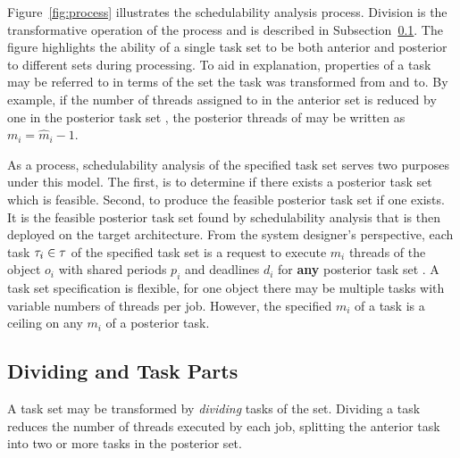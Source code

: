 Figure~\ref{fig:process} illustrates the schedulability analysis
process. Division is the transformative operation of the process and
is described in Subsection~\ref{sec:dividing}. The figure highlights the
ability of a single task set to be both anterior and posterior to
different sets during processing. To aid in explanation, properties of a
task may be referred to in terms of the set the task was transformed
from and to. By example, if the number of threads assigned to 
in the anterior set \supts{} is reduced by one in the posterior task
set \tasks{}, the posterior threads of  may be written as
${m_i = \hat{m}_i - 1}$.

As a process, schedulability analysis of the specified task set serves
two purposes under this model. The first, is to determine if there exists a
posterior task set which is feasible. Second, to produce the feasible
posterior task set if one exists. It is the feasible posterior task
set \tasks{} found by schedulability analysis that is then
deployed on the target architecture. From the system designer's
perspective, each task ${\tau_{i} \in \tau{}}$ of the specified
task set is a request to execute ${m_i}$ threads of the object ${o_i}$
with shared periods ${p_i}$ and deadlines ${d_i}$ for \textbf{any}
posterior task set \tasks{}. A task set specification is flexible,
for one object there may be multiple tasks with variable numbers of
threads per job. However, the specified ${m_i}$ of a task is a ceiling
on any ${m_i}$ of a posterior task. 

\subsection{Dividing and Task Parts}
\label{sec:dividing}

A task set may be transformed by \emph{dividing} tasks of the set.
Dividing a task reduces the number of threads executed by each
job, splitting the anterior task into two or more tasks in the
posterior set. 

